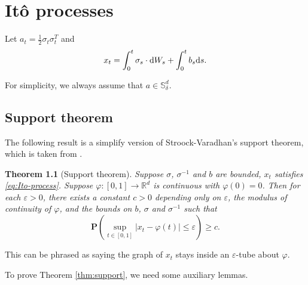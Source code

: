 \documentclass[twoside, 12pt]{book}
\numberwithin{equation}{chapter}
\newtheorem{theorem}{Theorem}[section]
\def\mR{{\mathbb R}}
\def\mS{{\mathbb S}}
\def\bP{{\mathbf P}}
\def\l{\left}
\def\r{\right}
\def\geq{\geqslant}
\def\leq{\leqslant}
\def\d{\text{\rm{d}}}
\def\eps{\varepsilon}
\begin{document}
	
	\chapter{It\^o processes}\label{chapt:Ito}
	Let $a_t=\frac{1}{2} \sigma_t\sigma_t^{T}$ and 
	\begin{equation}\label{eq:Ito-process}
		x_t= \int_0^t \sigma_s \cdot \d W_s+\int_0^t b_s \d s . 
	\end{equation}
	
	For simplicity,  we always assume that $a\in \mS^d_{\delta}$. 
	
	\section{Support theorem} 
	The following result is a simplify version of Stroock-Varadhan's support theorem, which is taken from \cite{bass1998diffusions}. 
	\begin{theorem}[Support theorem]
		Suppose $\sigma$, $\sigma^{-1}$ and $b$ are bounded, $x_t$ satisfies \eqref{eq:Ito-process}. Suppose $\varphi: [0,1]\to \mR^d$ is continuous with $\varphi(0)=0$. Then for each $\eps>0$, there exists a constant $c>0$ depending only on $\eps$, the modulus of continuity of $\varphi$, and the bounds on $b$, $\sigma$ and $\sigma^{-1}$ such that 
		\begin{equation}\label{Eq-support}
			\bP\l(\sup_{t\in [0,1]}|x_t-\varphi(t)|\leq \eps\r)\geq c. 
		\end{equation}
	\end{theorem}\label{thm:support}
	This can be phrased as saying the graph of $x_t$ stays inside an $\eps$-tube about $\varphi$. 
	
	To prove Theorem \ref{thm:support}, we need some  auxiliary lemmas. 
	
\end{document}
